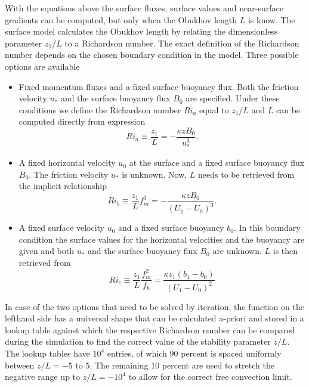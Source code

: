 \documentclass[gmd]{copernicus}
\begin{document}
With the equations above the surface fluxes, surface values and near-surface gradients can be computed, but only when the Obukhov length $L$ is know. The surface model calculates the Obukhov length by relating the dimensionless parameter $z_1/ L$ to a Richardson number. The exact definition of the Richardson number depends on the chosen boundary condition in the model. Three possible options are available
\begin{itemize}
	\item Fixed momentum fluxes and a fixed surface buoyancy flux. Both the friction velocity $u_*$ and the surface buoyancy flux $B_0$ are specified. Under these conditions we define the Richardson number $Ri_a$ equal to $z_1/L$  and $L$ can be computed directly from expression
	\begin{equation}
	Ri_a \equiv \dfrac{z_1}{L} = - \dfrac{\kappa z B_0}{u_*^3}.
	\end{equation}
	\item A fixed horizontal velocity $u_0$ at the surface and a fixed surface buoyancy flux $B_0$. The friction velocity $u_*$ is unknown. Now,  $L$ needs to be retrieved from the implicit relationship 
	\begin{equation}
	Ri_b \equiv \dfrac{z_1}{L} f_m^3 = - \dfrac{\kappa z B_0}{ \left(U_1 - U_0 \right)^3}.
	\end{equation}
	\item A fixed surface velocity $u_0$ and a fixed surface buoyancy $b_0$. In this boundary condition the surface values for the horizontal velocities and the buoyancy are given and both $u_*$ and the surface buoyancy flux $B_0$ are unknown. $L$ is then retrieved from
	\begin{equation}
	Ri_c \equiv \dfrac{z_1}{L} \dfrac{f_m^2}{f_h} = \dfrac{\kappa z_1 \left(b_1 - b_0 \right)}{ \left(U_1 - U_0 \right)^2}
	\end{equation}
\end{itemize}
In case of the two options that need to be solved by iteration, the function on the lefthand side has a universal shape that can be calculated a-priori and stored in a lookup table against which the respective Richardson number can be compared during the simulation to find the correct value of the stability parameter $z/L$. The lookup tables have $10^4$ entries, of which 90 percent is spaced uniformly between $z/L = -5$ to $5$. The remaining 10 percent are used to stretch the negative range up to $z/L = -10^4$ to allow for the correct free convection limit.
\end{document}
